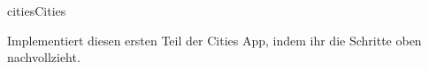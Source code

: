 \documentclass[parskip=half, final]{scrreprt}
\begin{document}
\begin{lecture}
\begin{enumerate}
\end{enumerate}

\begin{exc}
\begin{excitem}{cities}{Cities}

Implementiert diesen ersten Teil der Cities App, indem ihr die Schritte oben nachvollzieht.

\end{excitem}
\end{exc}


\end{lecture}
\end{document}
